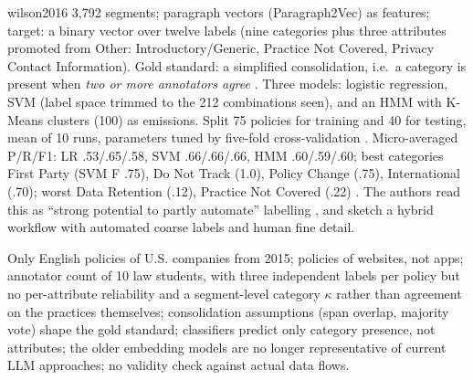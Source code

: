 \begin{papercard}{wilson2016}
 3,792 segments; paragraph vectors (Paragraph2Vec) as features; target: a binary vector over twelve labels (nine categories plus three attributes promoted from Other: Introductory/Generic, Practice Not Covered, Privacy Contact Information). Gold standard: a simplified consolidation, i.e.\ a category is present when \emph{two or more annotators agree} . Three models: logistic regression, SVM (label space trimmed to the 212 combinations seen), and an HMM with K-Means clusters (100) as emissions. Split 75 policies for training and 40 for testing, mean of 10 runs, parameters tuned by five-fold cross-validation . Micro-averaged P/R/F1: LR .53/.65/.58, SVM .66/.66/.66, HMM .60/.59/.60; best categories First Party (SVM F .75), Do Not Track (1.0), Policy Change (.75), International (.70); worst Data Retention (.12), Practice Not Covered (.22) . The authors read this as ``strong potential to partly automate'' labelling , and sketch a hybrid workflow with automated coarse labels and human fine detail.

 Only English policies of U.S. companies from 2015; policies of websites, not apps; annotator count of 10 law students, with three independent labels per policy but no per-attribute reliability and a segment-level category $\kappa$ rather than agreement on the practices themselves; consolidation assumptions (span overlap, majority vote) shape the gold standard; classifiers predict only category presence, not attributes; the older embedding models are no longer representative of current LLM approaches; no validity check against actual data flows.


\end{papercard}
